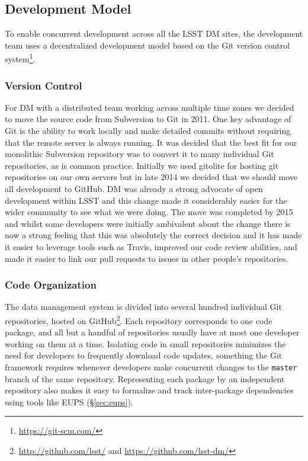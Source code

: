 \subsection{Development Model}\label{sec:development}

To enable concurrent development across all the LSST DM sites, the development team uses a decentralized development model based on the Git version control system\footnote{\url{https://git-scm.com/}}.

\subsubsection{Version Control}\label{sec:git}\label{sec:subversion}

For DM with a distributed team working across multiple time zones we decided to  move the  source code from Subversion to Git in 2011.
One key advantage of Git  is the ability to work locally and make detailed commits without requiring that the remote server is always running.
It was decided that the best fit for our monolithic Subversion repository was to convert it to many individual Git repositories, as is common practice.
Initially we used gitolite for hosting git repositories on our own servers but in late 2014 we decided that we should move all development to GitHub\cite{Document-17187}.
DM was already a strong advocate of open development within LSST and this change made it considerably easier for the wider community to see what we were doing.
The move was completed by 2015 and whilst some developers were initially ambivalent about the change there is now a strong feeling that this was absolutely the correct decision and it has made it easier to leverage tools such as Travis, improved our code review abilities, and made it easier to link our pull requests to issues in other people's repositories.

\subsubsection{Code Organization}\label{sec:git_repositories}

The data management system is divided into several hundred individual Git repositories, hosted on GitHub\footnote{\url{http://github.com/lsst/} and \url{https://github.com/lsst-dm/}}.
Each repository corresponds to one code package, and all but a handful of repositories usually have at most one developer working on them at a time.
Isolating code in small repositories minimizes the need for developers to frequently download code updates, something the Git framework requires whenever developers make concurrent changes to the \texttt{master} branch of the same repository.
Representing each package by an independent repository also makes it easy to formalize and track inter-package dependencies using tools like EUPS (\S\ref{sec:eups}).

